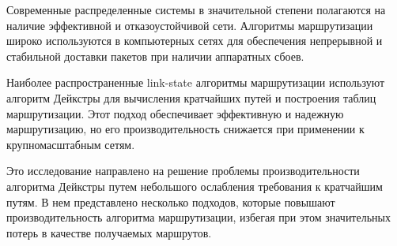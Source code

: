 Современные распределенные системы в значительной степени полагаются на наличие эффективной и отказоустойчивой сети. Алгоритмы маршрутизации широко используются в компьютерных сетях для обеспечения непрерывной и стабильной доставки пакетов при наличии аппаратных сбоев.

Наиболее распространенные link-state алгоритмы маршрутизации используют алгоритм Дейкстры для вычисления кратчайших путей и построения таблиц маршрутизации. Этот подход обеспечивает эффективную и надежную маршрутизацию, но его производительность снижается при применении к крупномасштабным сетям.

Это исследование направлено на решение проблемы производительности алгоритма Дейкстры путем небольшого ослабления требования к кратчайшим путям. В нем представлено несколько подходов, которые повышают производительность алгоритма маршрутизации, избегая при этом значительных потерь в качестве получаемых маршрутов.
